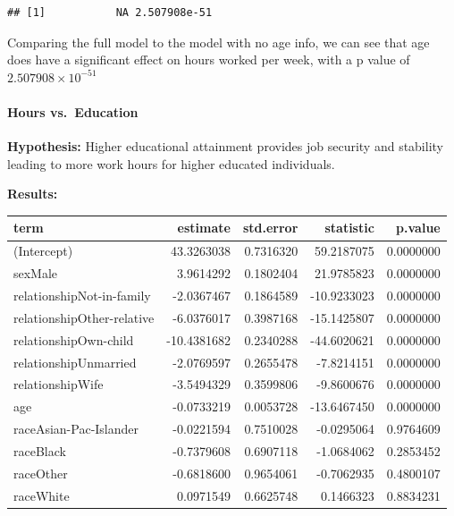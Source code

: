 \documentclass[]{article}
\newenvironment{Shaded}{\begin{snugshade}}{\end{snugshade}}
\newcommand{\KeywordTok}[1]{\textcolor[rgb]{0.13,0.29,0.53}{\textbf{#1}}}
\newcommand{\NormalTok}[1]{#1}
\newcommand{\OperatorTok}[1]{\textcolor[rgb]{0.81,0.36,0.00}{\textbf{#1}}}
\let\oldparagraph\paragraph
\renewcommand{\paragraph}[1]{\oldparagraph{#1}\mbox{}}
\begin{document}
\begin{Shaded}
\end{Shaded}

\begin{verbatim}
## [1]           NA 2.507908e-51
\end{verbatim}

Comparing the full model to the model with no age info, we can see that
age does have a significant effect on hours worked per week, with a p
value of \ensuremath{2.507908\times 10^{-51}}

\hypertarget{hours-vs.education}{%
\paragraph{Hours vs.~Education}\label{hours-vs.education}}

\textbf{Hypothesis:} Higher educational attainment provides job security
and stability leading to more work hours for higher educated
individuals.

\textbf{Results:}

\begin{table}[H]
\centering
\begin{tabular}{l|r|r|r|r}
\hline
term & estimate & std.error & statistic & p.value\\
\hline
(Intercept) & 43.3263038 & 0.7316320 & 59.2187075 & 0.0000000\\
\hline
sexMale & 3.9614292 & 0.1802404 & 21.9785823 & 0.0000000\\
\hline
relationshipNot-in-family & -2.0367467 & 0.1864589 & -10.9233023 & 0.0000000\\
\hline
relationshipOther-relative & -6.0376017 & 0.3987168 & -15.1425807 & 0.0000000\\
\hline
relationshipOwn-child & -10.4381682 & 0.2340288 & -44.6020621 & 0.0000000\\
\hline
relationshipUnmarried & -2.0769597 & 0.2655478 & -7.8214151 & 0.0000000\\
\hline
relationshipWife & -3.5494329 & 0.3599806 & -9.8600676 & 0.0000000\\
\hline
age & -0.0733219 & 0.0053728 & -13.6467450 & 0.0000000\\
\hline
raceAsian-Pac-Islander & -0.0221594 & 0.7510028 & -0.0295064 & 0.9764609\\
\hline
raceBlack & -0.7379608 & 0.6907118 & -1.0684062 & 0.2853452\\
\hline
raceOther & -0.6818600 & 0.9654061 & -0.7062935 & 0.4800107\\
\hline
raceWhite & 0.0971549 & 0.6625748 & 0.1466323 & 0.8834231\\
\hline
\end{tabular}
\end{table}
\end{document}
